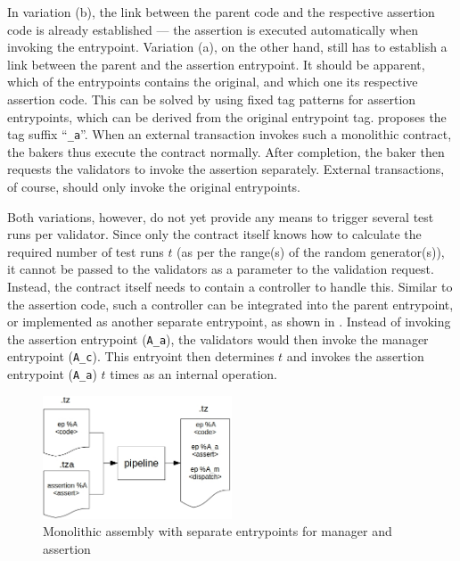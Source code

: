 In variation (b), the link between the parent code and the respective assertion code is already established --- the assertion is executed automatically when invoking the entrypoint. Variation (a), on the other hand, still has to establish a link between the parent and the assertion entrypoint. It should be apparent, which of the entrypoints contains the original, and which one its respective assertion code. This can be solved by using fixed tag patterns for assertion entrypoints, which can be derived from the original entrypoint tag.  proposes the tag suffix ``\texttt{\_a}''. When an external transaction invokes such a monolithic contract, the bakers thus execute the contract normally. After completion, the baker then requests the validators to invoke the assertion separately. External transactions, of course, should only invoke the original entrypoints.

Both variations, however, do not yet provide any means to trigger several test runs per validator. Since only the contract itself knows how to calculate the required number of test runs $t$ (as per the range(s) of the random generator(s)), it cannot be passed to the validators as a parameter to the validation request. Instead, the contract itself needs to contain a controller to handle this. Similar to the assertion code, such a controller can be integrated into the parent entrypoint, or implemented as another separate entrypoint, as shown in . Instead of invoking the assertion entrypoint (\texttt{A\_a}), the validators would then invoke the manager entrypoint (\texttt{A\_c}). This entryoint then determines $t$ and invokes the assertion entrypoint (\texttt{A\_a}) $t$ times as an internal operation. 
\begin{figure}[h]
\centering
  \includegraphics[width=0.5\textwidth]{figures/5-offline_tezos/pipeline_output_mono_ep.jpg}
	\caption{Monolithic assembly with separate entrypoints for manager and assertion}
	\label{fig:monolithic_orchestration}
\end{figure}


